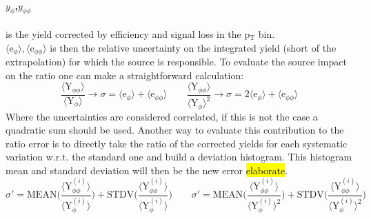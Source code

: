 \paragraph{$y_{\phi}$,$y_{\phi\phi}$} is the yield corrected by efficiency and signal loss in the p$_{\text{T}}$ bin.\\
$\langle \text{e}_{\phi}\rangle, \langle \text{e}_{\phi\phi}\rangle$ is then the relative uncertainty on the integrated yield (short of the extrapolation) for which the source is responsible. To evaluate the source impact on the ratio one can make a straightforward calculation:
\begin{equation}
\frac{\langle \text{Y}_{\phi\phi} \rangle}{\langle \text{Y}_{\phi} \rangle} \to \sigma = \langle \text{e}_{\phi}\rangle + \langle \text{e}_{\phi\phi}\rangle \qquad \frac{\langle \text{Y}_{\phi\phi} \rangle}{\langle \text{Y}_{\phi} \rangle^{2}} \to \sigma = 2\langle \text{e}_{\phi}\rangle + \langle \text{e}_{\phi\phi}\rangle 
\label{}
\end{equation}
Where the uncertainties are considered correlated, if this is not the case a quadratic sum should be used. Another way to evaluate this contribution to the ratio error is to directly take the ratio of the corrected yields for each systematic variation w.r.t. the standard one and build a deviation histogram. This histogram mean and standard deviation will then be the new error \hl{elaborate}.
\begin{equation}
\sigma' = \text{MEAN}\Big( \frac{\langle \text{Y}_{\phi\phi}^{(i)} \rangle}{\langle \text{Y}_{\phi}^{(i)} \rangle} \Big) + \text{STDV}\Big( \frac{\langle \text{Y}_{\phi\phi}^{(i)} \rangle}{\langle \text{Y}_{\phi}^{(i)} \rangle} \Big) \qquad \sigma' = \text{MEAN}\Big( \frac{\langle \text{Y}_{\phi\phi}^{(i)} \rangle}{\langle \text{Y}_{\phi}^{(i)} \rangle^{2}} \Big) + \text{STDV}\Big( \frac{\langle \text{Y}_{\phi\phi}^{(i)} \rangle}{\langle \text{Y}_{\phi}^{(i)} \rangle^{2}} \Big)
\label{}
\end{equation}

